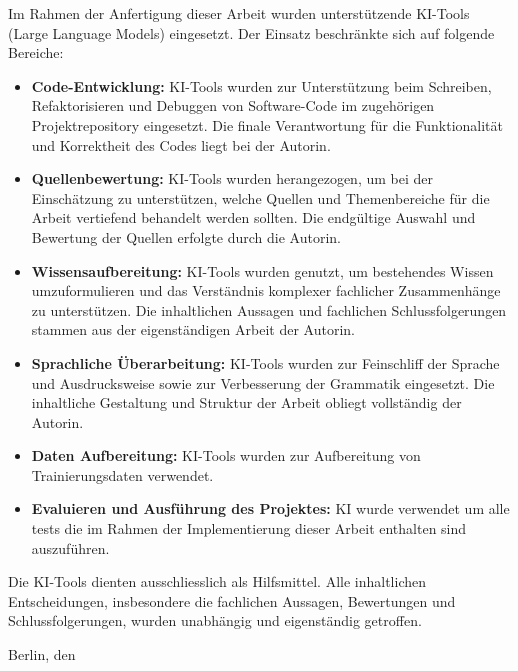 

Im Rahmen der Anfertigung dieser Arbeit wurden unterstützende KI-Tools (Large Language Models) eingesetzt.
Der Einsatz beschränkte sich auf folgende Bereiche:

\begin{itemize}
    \item \textbf{Code-Entwicklung:} KI-Tools wurden zur Unterstützung beim Schreiben, Refaktorisieren 
          und Debuggen von Software-Code im zugehörigen Projektrepository eingesetzt. Die finale 
          Verantwortung für die Funktionalität und Korrektheit des Codes liegt bei der Autorin.
          
    \item \textbf{Quellenbewertung:} KI-Tools wurden herangezogen, um bei der Einschätzung zu 
          unterstützen, welche Quellen und Themenbereiche für die Arbeit vertiefend behandelt 
          werden sollten. Die endgültige Auswahl und Bewertung der Quellen erfolgte durch die Autorin.
          
    \item \textbf{Wissensaufbereitung:} KI-Tools wurden genutzt, um bestehendes Wissen umzuformulieren 
          und das Verständnis komplexer fachlicher Zusammenhänge zu unterstützen. Die inhaltlichen 
          Aussagen und fachlichen Schlussfolgerungen stammen aus der eigenständigen Arbeit der Autorin.
          
    \item \textbf{Sprachliche Überarbeitung:} KI-Tools wurden zur Feinschliff der Sprache und 
          Ausdrucksweise sowie zur Verbesserung der Grammatik eingesetzt. Die inhaltliche 
          Gestaltung und Struktur der Arbeit obliegt vollständig der Autorin.
     
      \item \textbf{Daten Aufbereitung:} KI-Tools wurden zur Aufbereitung von Trainierungsdaten verwendet.

      \item \textbf{Evaluieren und Ausführung des Projektes:} KI wurde verwendet um alle tests die im Rahmen der Implementierung dieser Arbeit enthalten sind auszuführen.
\end{itemize}

Die KI-Tools dienten ausschliesslich als Hilfsmittel. Alle inhaltlichen Entscheidungen, 
insbesondere die fachlichen Aussagen, Bewertungen und Schlussfolgerungen, wurden 
unabhängig und eigenständig getroffen.

\vskip 1cm

Berlin, den \thedatum

\vskip 1.5cm

\theautor
